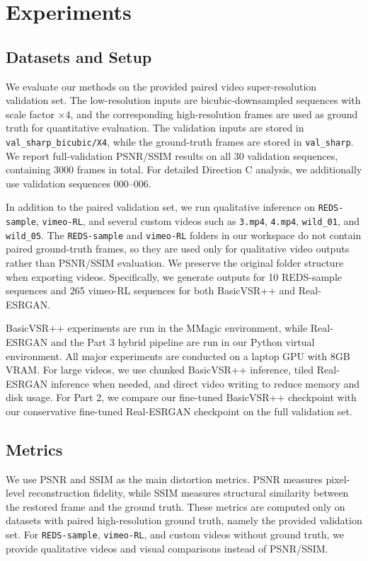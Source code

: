 \section{Experiments}

\subsection{Datasets and Setup}

We evaluate our methods on the provided paired video super-resolution validation set. The low-resolution inputs are bicubic-downsampled sequences with scale factor $\times 4$, and the corresponding high-resolution frames are used as ground truth for quantitative evaluation. The validation inputs are stored in \texttt{val\_sharp\_bicubic/X4}, while the ground-truth frames are stored in \texttt{val\_sharp}. We report full-validation PSNR/SSIM results on all 30 validation sequences, containing 3000 frames in total. For detailed Direction C analysis, we additionally use validation sequences 000--006.

In addition to the paired validation set, we run qualitative inference on \texttt{REDS-sample}, \texttt{vimeo-RL}, and several custom videos such as \texttt{3.mp4}, \texttt{4.mp4}, \texttt{wild\_01}, and \texttt{wild\_05}. The \texttt{REDS-sample} and \texttt{vimeo-RL} folders in our workspace do not contain paired ground-truth frames, so they are used only for qualitative video outputs rather than PSNR/SSIM evaluation. We preserve the original folder structure when exporting videos. Specifically, we generate outputs for 10 REDS-sample sequences and 265 vimeo-RL sequences for both BasicVSR++ and Real-ESRGAN.

BasicVSR++ experiments are run in the MMagic environment, while Real-ESRGAN and the Part 3 hybrid pipeline are run in our Python virtual environment. All major experiments are conducted on a laptop GPU with 8GB VRAM. For large videos, we use chunked BasicVSR++ inference, tiled Real-ESRGAN inference when needed, and direct video writing to reduce memory and disk usage. For Part 2, we compare our fine-tuned BasicVSR++ checkpoint with our conservative fine-tuned Real-ESRGAN checkpoint on the full validation set.

\subsection{Metrics}

We use PSNR and SSIM as the main distortion metrics. PSNR measures pixel-level reconstruction fidelity, while SSIM measures structural similarity between the restored frame and the ground truth. These metrics are computed only on datasets with paired high-resolution ground truth, namely the provided validation set. For \texttt{REDS-sample}, \texttt{vimeo-RL}, and custom videos without ground truth, we provide qualitative videos and visual comparisons instead of PSNR/SSIM.

